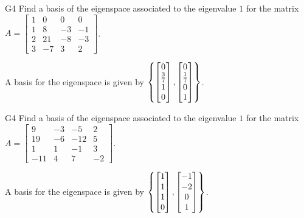 \begin{problem}{G4}
Find a basis of the eigenspace associated to the eigenvalue \(1\) for the matrix 
\(A=\begin{bmatrix} 1&0&0&0\\1&8 & -3 & -1 \\ 2&21 & -8 & -3 \\ 3&-7 & 3  & 2 \end{bmatrix}\).
\end{problem}
\begin{solution}
A basis for the eigenspace is given by $\left\{\begin{bmatrix} 0\\\frac{3}{7} \\ 1 \\ 0 \end{bmatrix},\begin{bmatrix}0\\\frac{1}{7} \\ 0 \\ 1 \end{bmatrix}\right\}$.
\end{solution}

\begin{problem}{G4}
Find a basis of the eigenspace associated to the eigenvalue \(1\) for the matrix 
\(A=\begin{bmatrix}9 & -3 & -5 & 2 \\ 19 & -6 & -12 & 5 \\ 1 & 1 & -1 & 3 \\ -11 & 4 & 7 & -2 \end{bmatrix}\).
\end{problem}
\begin{solution}
A basis for the eigenspace is given by $\left\{\begin{bmatrix}1 \\ 1 \\ 1 \\ 0\end{bmatrix},\begin{bmatrix} -1 \\ -2 \\ 0 \\ 1 \end{bmatrix}\right\}$.
\end{solution}

